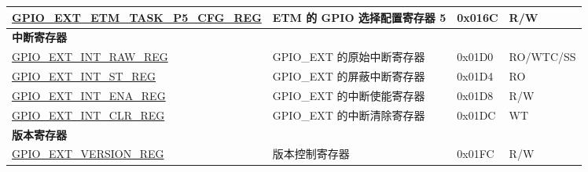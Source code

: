 \begin{longtable}{ | p{6cm} | p{7.2cm} | p{1.3cm} | p{1cm} | }
\hyperref[regdesc:GPIOEXTETMTASKP5CFGREG]{GPIO\_EXT\_ETM\_TASK\_P5\_CFG\_REG} & ETM 的 GPIO 选择配置寄存器 5 & 0x016C & R/W \\ \hline
\multicolumn{4}{|l|}{\textbf{中断寄存器}} \\ \hline
\hyperref[regdesc:GPIOEXTINTRAWREG]{GPIO\_EXT\_INT\_RAW\_REG} & GPIO\_EXT 的原始中断寄存器 & 0x01D0 & RO/WTC/SS \\ \hline
\hyperref[regdesc:GPIOEXTINTSTREG]{GPIO\_EXT\_INT\_ST\_REG} & GPIO\_EXT 的屏蔽中断寄存器 & 0x01D4 & RO \\ \hline
\hyperref[regdesc:GPIOEXTINTENAREG]{GPIO\_EXT\_INT\_ENA\_REG} & GPIO\_EXT 的中断使能寄存器 & 0x01D8 & R/W \\ \hline
\hyperref[regdesc:GPIOEXTINTCLRREG]{GPIO\_EXT\_INT\_CLR\_REG} & GPIO\_EXT 的中断清除寄存器 & 0x01DC & WT \\ \hline
\multicolumn{4}{|l|}{\textbf{版本寄存器}} \\ \hline
\hyperref[regdesc:GPIOEXTVERSIONREG]{GPIO\_EXT\_VERSION\_REG} & 版本控制寄存器 & 0x01FC & R/W \\ \hline
\end{longtable}
